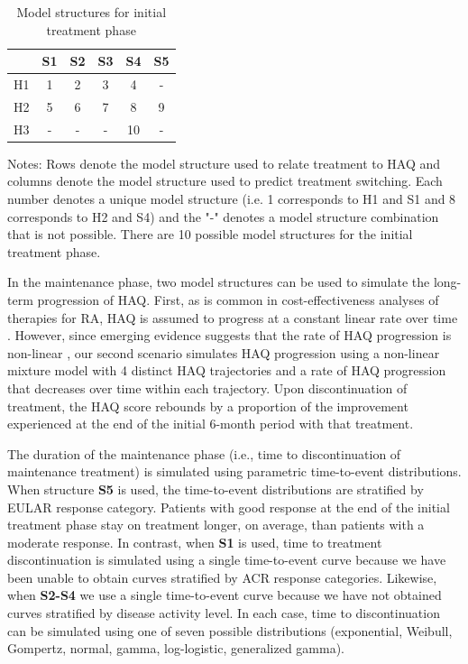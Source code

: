 \documentclass[11pt,final,fleqn]{article}\usepackage[]{graphicx}\usepackage[]{color}
\theoremstyle{plain}
\begin{document}
\begin{table}[!ht] 
\begin{center}
\begin{threeparttable}
\caption{Model structures for initial treatment phase} \label{tbl:initial-model-structure}
\begin{tabularx}{\textwidth}{@{\extracolsep{\fill}}lccccc}
\hline
\multicolumn{1}{l}{} & \multicolumn{1}{c}{S1} & \multicolumn{1}{c}{S2} & \multicolumn{1}{c}{S3} & \multicolumn{1}{c}{S4} & \multicolumn{1}{c}{S5}  \\
\hline
H1 & 1 & 2 & 3 & 4 & - \\
H2 & 5 & 6 & 7 & 8 & 9 \\
H3 & - & - & - & 10 & - \\
\hline
\end{tabularx}
\scriptsize
Notes: Rows denote the model structure used to relate treatment to HAQ and columns denote the model structure used to predict treatment switching. Each number denotes a unique model structure (i.e. 1 corresponds to H1 and S1 and 8 corresponds to H2 and S4) and the "-" denotes a model structure combination that is not possible. There are 10 possible model structures for the initial treatment phase. 
\end{threeparttable}
\end{center}
\end{table}


In the maintenance phase, two model structures can be used to simulate the long-term progression of HAQ. First, as is common in cost-effectiveness analyses of therapies for RA, HAQ is assumed to progress at a constant linear rate over time \citep[see][]{tosh2011sheffield, wailoo2008biologic}. However, since emerging evidence suggests that the rate of HAQ progression is non-linear \citep{gibson2016haq}, our second scenario simulates HAQ progression using a non-linear mixture model \citep{norton2014health} with 4 distinct HAQ trajectories and a rate of HAQ progression that decreases over time within each trajectory. Upon discontinuation of treatment, the HAQ score rebounds by a proportion of the improvement experienced at the end of the initial 6-month period with that treatment.

The duration of the maintenance phase (i.e., time to discontinuation of maintenance treatment) is simulated using parametric time-to-event distributions. When structure \textbf{S5} is used, the time-to-event distributions are stratified by EULAR response category. Patients with good response at the end of the initial treatment phase stay on treatment longer, on average, than patients with a moderate response. In contrast, when \textbf{S1} is used, time to treatment discontinuation is simulated using a single time-to-event curve because we have been unable to obtain curves stratified by ACR response categories. Likewise, when \textbf{S2-S4} we use a single time-to-event curve because we have not obtained curves stratified by disease activity level. In each case, time to discontinuation can be simulated using one of seven possible distributions (exponential, Weibull, Gompertz, normal, gamma, log-logistic, generalized gamma).
\end{document}
